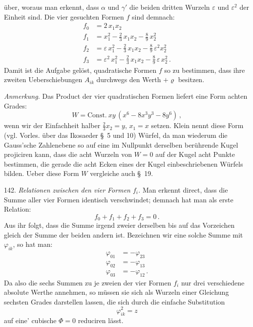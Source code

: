 \documentclass[11pt]{article}
\providecommand{\weberpage}[1]{}
\providecommand{\weq}[2]{\begin{equation}\tag{#1}#2\end{equation}}
\let\Phi\varPhi
\begin{document}
\weberpage{161}
über, woraus man erkennt, dass $\alpha$ und $\gamma'$ die beiden dritten Wurzeln $\varepsilon$ und $\varepsilon^2$ der Einheit sind. Die vier gesuchten Formen $f$ sind demnach:
\[
\begin{aligned}
f_0 &= 2\,x_1x_2\\
f_1 &= x_1^2 - \frac{2}{3}\,x_1x_2 - \frac{8}{9}\,x_2^2\\
f_2 &= \varepsilon\,x_1^2 - \frac{2}{3}\,x_1x_2 - \frac{8}{9}\,\varepsilon^2 x_2^2\\
f_3 &= \varepsilon^2\,x_1^2 - \frac{2}{3}\,x_1x_2 - \frac{8}{9}\,\varepsilon\,x_2^2\,.
\end{aligned}
\]
Damit ist die Aufgabe gelöst, quadratische Formen $f$ so zu bestimmen, dass ihre zweiten Ueberschiebungen $A_{ik}$ durchwegs den Werth $+\varrho$ besitzen.

\textit{Anmerkung.} Das Product der vier quadratischen Formen liefert eine Form achten Grades:
\[
W = \text{Const.}\ xy\,(x^6 - 8x^3y^3 - 8y^6)\,,
\]
wenn wir der Einfachheit halber $\frac{2}{3}x_2=y$, $x_1=x$ setzen. Klein nennt diese Form (vgl. Vorles. über das Ikosaeder \S~5 und 10) Würfel, da man wiederum die Gauss'sche Zahlenebene so auf eine im Nullpunkt derselben berührende Kugel projiciren kann, dass die acht Wurzeln von $W=0$ auf der Kugel acht Punkte bestimmen, die gerade die acht Ecken eines der Kugel einbeschriebenen Würfels bilden. Ueber diese Form $W$ vergleiche auch \S~19.

142. \textit{Relationen zwischen den vier Formen $f_i$.} Man erkennt direct, dass die Summe aller vier Formen identisch verschwindet; demnach hat man als erste Relation:
\weq{1}{f_0+f_1+f_2+f_3=0\,.}
Aus ihr folgt, dass die Summe irgend zweier derselben bis auf das Vorzeichen gleich der Summe der beiden andern ist. Bezeichnen wir eine solche Summe mit $\varphi_{ik}$, so hat man:
\weq{2}{\begin{aligned}
\varphi_{01} &= -\varphi_{23}\\
\varphi_{02} &= -\varphi_{13}\\
\varphi_{03} &= -\varphi_{12}\,.
\end{aligned}}
Da also die sechs Summen zu je zweien der vier Formen $f_i$ nur drei verschiedene absolute Werthe annehmen, so müssen sie sich als Wurzeln einer Gleichung sechsten Grades darstellen lassen, die sich durch die einfache Substitution
\[
\varphi_{ik}^2 = z
\]
auf eine' cubische $\Phi=0$ reduciren lässt. %
\end{document}
